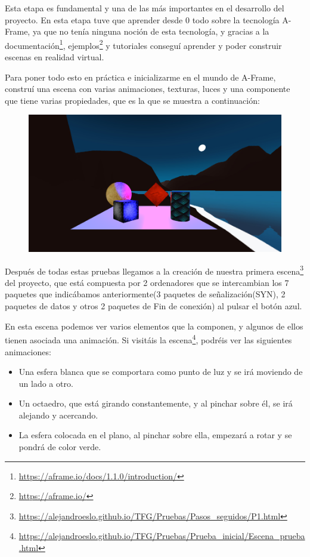 \documentclass[a4paper, 12pt]{book}
\begin{document}
Esta etapa es fundamental y una de las más importantes en el desarrollo del proyecto.
En esta etapa tuve que aprender desde 0 todo sobre la tecnología A-Frame, ya que no tenía ninguna noción de esta tecnología, y gracias a la documentación\footnote{\url{https://aframe.io/docs/1.1.0/introduction/}}, ejemplos\footnote{\url{https://aframe.io/}} y tutoriales conseguí aprender y poder construir escenas en realidad virtual.

Para poner todo esto en práctica e inicializarme en el mundo de A-Frame, construí una escena con varias animaciones, texturas, luces y una componente que tiene varias propiedades, que es la que se muestra a continuación:

\begin{figure}[h]
\centering
    \includegraphics[scale=0.45]{img/escena0.png}
\end{figure}
Después de todas estas pruebas llegamos a la creación de nuestra primera escena\footnote{\url{https://alejandroeslo.github.io/TFG/Pruebas/Pasos_seguidos/P1.html}} del proyecto, que está compuesta por 2 ordenadores que se intercambian los 7 paquetes que indicábamos anteriormente(3 paquetes de señalización(SYN), 2 paquetes de datos y otros 2 paquetes de Fin de conexión) al pulsar el botón azul.


En esta escena podemos ver varios elementos que la componen, y algunos de ellos tienen asociada una animación.
Si visitáis la escena\footnote{\url{https://alejandroeslo.github.io/TFG/Pruebas/Prueba_inicial/Escena_prueba.html}}, podréis ver las siguientes animaciones:

\begin{itemize}

    \item Una esfera blanca que se comportara como punto de luz y se irá moviendo de un lado a otro.
    
    \item Un octaedro, que está girando constantemente, y al pinchar sobre él, se irá alejando y acercando.
    
    \item La esfera colocada en el plano, al pinchar sobre ella, empezará a rotar y se pondrá de color verde.
    
\end{itemize}
\end{document}
